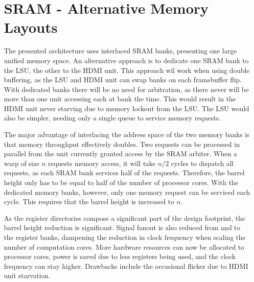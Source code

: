 \section{SRAM - Alternative Memory Layouts}

The presented architecture uses interlaced SRAM banks, presenting one large unified memory space.
An alternative approach is to dedicate one SRAM bank to the LSU, the other to the HDMI unit.
This approach wil work when using double buffering, as the LSU and HDMI unit can swap banks on each framebuffer flip.
With dedicated banks there will be no need for arbitration, as there never will be more than one unit accessing each at bank the time.
This would result in the HDMI unit never starving due to memory lockout from the LSU.
The LSU would also be simpler, needing only a single queue to service memory requests.

The major advantage of interlacing the address space of the two memory banks is that memory throughput effectively doubles.
Two requests can be processed in parallel from the unit currently granted access by the SRAM arbiter.
When a warp of size $n$ requests memory access, it will take $n/2$ cycles to dispatch all requests, as each SRAM bank services half of the requests.
Therefore, the barrel height only has to be equal to half of the number of processor cores.
With the dedicated memory banks, however, only one memory request can be serviced each cycle.
This requires that the barrel height is increased to $n$.

As the register directories compose a significant part of the design footprint, the barrel height reduction is significant.
Signal fanout is also reduced from and to the register banks, dampening the reduction in clock frequency when scaling the number of computation cores.
More hardware resources can now be allocated to processor cores, power is saved due to less registers being used, and the clock frequency can stay higher.
Drawbacks include the occasional flicker due to HDMI unit starvation.
